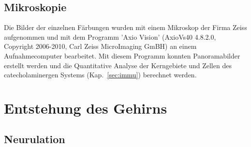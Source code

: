 \documentclass[12pt,a4paper,pdftex]{article}
\begin{document}
\subsection{Mikroskopie}

Die Bilder der einzelnen Färbungen wurden mit einem Mikroskop der Firma Zeiss aufgenommen und mit dem Programm 'Axio Vision' (AxioVs40 4.8.2.0, Copyright 2006-2010, Carl Zeiss MicroImaging GmBH) an einem Aufnahmecomputer bearbeitet. Mit diesem Programm konnten Panoramabilder erstellt werden und die Quantitative Analyse der Kerngebiete und Zellen des catecholaminergen Systems (Kap.~\ref{sec:immu}) berechnet werden.




\newpage
\section{Entstehung des Gehirns}

\subsection{Neurulation}
\label{subsec:Neurulation} 
\end{document}
